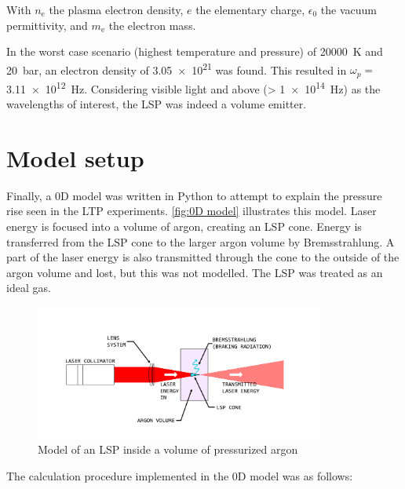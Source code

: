         With $n_\mathrm{e}$ the plasma electron density, $e$ the elementary charge, $\epsilon_\mathrm{0}$ the vacuum permittivity, and $m_\mathrm{e}$ the electron mass.

        In the worst case scenario (highest temperature and pressure) of \qty{20000}{K} and \qty{20}{bar}, an electron density of \num{3.05e21} was found. This resulted in $\omega_p =$ \qty{3.11e12}{Hz}. Considering visible light and above (> \qty{1e14}{Hz}) as the wavelengths of interest, the LSP was indeed a volume emitter.

    \section{Model setup}
        
        Finally, a 0D model was written in Python to attempt to explain the pressure rise seen in the LTP experiments. \autoref{fig:0D model} illustrates this model. Laser energy is focused into a volume of argon, creating an LSP cone. Energy is transferred from the LSP cone to the larger argon volume by Bremsstrahlung. A part of the laser energy is also transmitted through the cone to the outside of the argon volume and lost, but this was not modelled. The LSP was treated as an ideal gas.

        \begin{figure}[!ht]
            \centering
            \includegraphics[width=0.85\textwidth]{assets/2 models/Modeling figure.pdf}
            \caption{Model of an LSP inside a volume of pressurized argon}
            \label{fig:0D model}
        \end{figure}

        The calculation procedure implemented in the 0D model was as follows:

